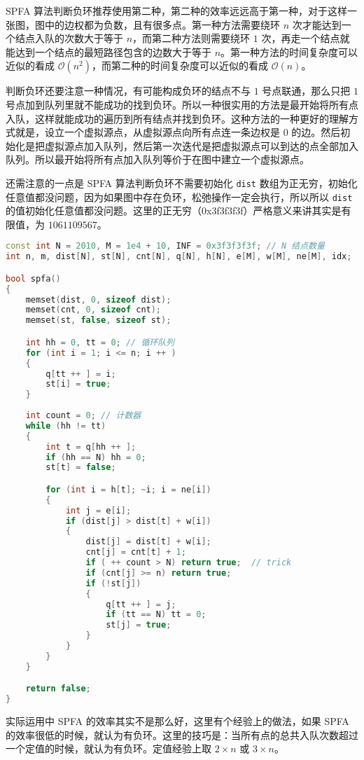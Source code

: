 SPFA 算法判断负环推荐使用第二种，第二种的效率远远高于第一种，对于这样一张图，图中的边权都为负数，且有很多点。第一种方法需要绕环 $n$ 次才能达到一个结点入队的次数大于等于 $n$，而第二种方法则需要绕环 $1$ 次，再走一个结点就能达到一个结点的最短路径包含的边数大于等于 $n$。第一种方法的时间复杂度可以近似的看成 $\mathcal{O}(n^2)$，而第二种的时间复杂度可以近似的看成 $\mathcal{O}(n)$。

判断负环还要注意一种情况，有可能构成负环的结点不与 $1$ 号点联通，那么只把 $1$ 号点加到队列里就不能成功的找到负环。所以一种很实用的方法是最开始将所有点入队，这样就能成功的遍历到所有结点并找到负环。这种方法的一种更好的理解方式就是，设立一个虚拟源点，从虚拟源点向所有点连一条边权是 $0$ 的边。然后初始化是把虚拟源点加入队列，然后第一次迭代是把虚拟源点可以到达的点全部加入队列。所以最开始将所有点加入队列等价于在图中建立一个虚拟源点。

还需注意的一点是 SPFA 算法判断负环不需要初始化 \verb|dist| 数组为正无穷，初始化任意值都没问题，因为如果图中存在负环，松弛操作一定会执行，所以所以 \verb|dist| 的值初始化任意值都没问题。这里的正无穷（0x3f3f3f3f）严格意义来讲其实是有限值，为 $1061109567$。

\begin{lstlisting}[language=cpp]
const int N = 2010, M = 1e4 + 10, INF = 0x3f3f3f3f; // N 结点数量
int n, m, dist[N], st[N], cnt[N], q[N], h[N], e[M], w[M], ne[M], idx;

bool spfa()
{
    memset(dist, 0, sizeof dist);
    memset(cnt, 0, sizeof cnt);
    memset(st, false, sizeof st);

    int hh = 0, tt = 0; // 循环队列
    for (int i = 1; i <= n; i ++ )
    {
        q[tt ++ ] = i;
        st[i] = true;
    }
    
    int count = 0; // 计数器
    while (hh != tt)
    {
        int t = q[hh ++ ];
        if (hh == N) hh = 0;
        st[t] = false;

        for (int i = h[t]; ~i; i = ne[i])
        {
            int j = e[i];
            if (dist[j] > dist[t] + w[i])
            {
                dist[j] = dist[t] + w[i];
                cnt[j] = cnt[t] + 1;
                if ( ++ count > N) return true;  // trick
                if (cnt[j] >= n) return true;
                if (!st[j])
                {
                    q[tt ++ ] = j;
                    if (tt == N) tt = 0;    
                    st[j] = true;
                }
            }
        }
    }

    return false;
}
\end{lstlisting}

实际运用中 SPFA 的效率其实不是那么好，这里有个经验上的做法，如果 SPFA 的效率很低的时候，就认为有负环。这里的技巧是：当所有点的总共入队次数超过一个定值的时候，就认为有负环。定值经验上取 $2 \times n$ 或 $3 \times n$。
